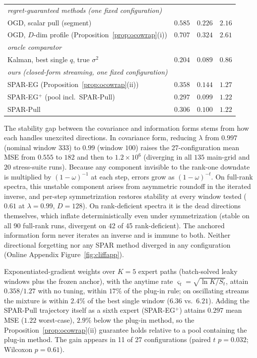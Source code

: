 \documentclass[twoside,11pt]{article}
\begin{document}
\begin{table}[t]
\begin{tabular}{lccc}
\multicolumn{3}{l}{\emph{regret-guaranteed methods (one fixed configuration)}}\\
OGD, scalar pull (segment) & $0.585$ & $0.226$ & $2.16$ \\
OGD, $D$-dim profile (Proposition~\ref{prop:ocowrap}(i)) & $0.707$ & $0.324$ & $2.61$ \\
\midrule
\multicolumn{3}{l}{\emph{oracle comparator}}\\
Kalman, best single $q$, true $\sigma^2$ & $\mathbf{0.204}$ & $\mathbf{0.089}$ & $\mathbf{0.86}$ \\
\midrule
\multicolumn{3}{l}{\emph{ours (closed-form streaming, one fixed configuration)}}\\
SPAR-EG (Proposition~\ref{prop:ocowrap}(ii)) & $0.358$ & $0.144$ & $1.27$ \\
SPAR-EG$^+$ (pool incl.\ SPAR-Pull) & $0.297$ & $0.099$ & $1.22$ \\
SPAR-Pull & $0.306$ & $0.100$ & $1.22$ \\
\bottomrule
\end{tabular}
\end{table}

The stability gap between the covariance and information forms stems from how each handles unexcited directions.
In covariance form, reducing $\lambda$ from $0.997$ (nominal window $333$) to $0.99$ (window $100$) raises the 27-configuration mean MSE from $0.555$ to $182$ and then to $1.2 \times 10^6$ (diverging in all $135$ main-grid and $20$ stress-suite runs).
Because any component invisible to the rank-one downdate is multiplied by $(1{-}\omega)^{-1}$ at each step, errors grow as $(1{-}\omega)^{-t}$.
On full-rank spectra, this unstable component arises from asymmetric roundoff in the iterated inverse, and per-step symmetrization restores stability at every window tested ($0.61$ at $\lambda = 0.99$, $D = 128$). On rank-deficient spectra it is the dead directions themselves, which inflate deterministically even under symmetrization (stable on all 90 full-rank runs, divergent on 42 of 45 rank-deficient). The anchored information form never iterates an inverse and is immune to both. Neither directional forgetting nor any SPAR method diverged in any configuration (Online Appendix Figure~\ref{fig:cliffapp}).

Exponentiated-gradient weights over $K = 5$ expert paths (batch-solved leaky windows plus the frozen anchor), with the anytime rate $\varsigma_t = \sqrt{\ln K / S_t}$, attain $0.358/1.27$ with no tuning, within $17\%$ of the plug-in rule; on oscillating streams the mixture is within $2.4\%$ of the best single window ($6.36$ vs.\ $6.21$).
Adding the SPAR-Pull trajectory itself as a sixth expert (SPAR-EG$^+$) attains $0.297$ mean MSE ($1.22$ worst-case), $2.9\%$ below the plug-in method, so the Proposition~\ref{prop:ocowrap}(ii) guarantee holds relative to a pool containing the plug-in method. The gain appears in 11 of 27 configurations (paired $t$ $p = 0.032$; Wilcoxon $p = 0.61$).
\end{document}

